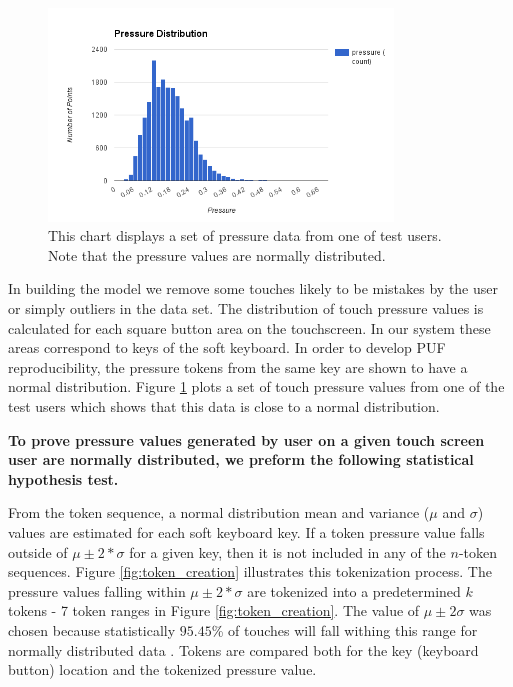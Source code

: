 \documentclass{acm_proc_article-sp}
\begin{document}
\begin{figure}
\centering
\includegraphics[width=3.6in]{normal_distribution.png}
\caption{This chart displays a set of pressure data from one of test users. Note that the pressure values are normally distributed.}
\label{fig:normal_distribution}
\end{figure}


In building the model we remove some touches likely to be mistakes by the user or simply outliers in the data set.
The distribution of touch pressure values is calculated for each square button area on the touchscreen. 
In our system these areas correspond to keys of the soft keyboard. In order to develop PUF reproducibility,
the pressure tokens from the same key are %
shown to have a normal distribution.
Figure \ref{fig:normal_distribution} plots a set of touch pressure values from one of the test users
which shows that this data is close to a normal distribution.

\textbf{
To prove pressure values generated by user on a given touch screen user are normally distributed,
we preform the following statistical hypothesis test.
}

From the token sequence, a normal distribution mean and variance ($\mu$ and $\sigma$) values are estimated for each soft keyboard key.
If a token pressure value falls outside of $\mu \pm 2*\sigma$ for a given key, 
then it is not included in any of the $n$-token sequences. 
Figure \ref{fig:token_creation} illustrates 
this tokenization process. The pressure values falling within $\mu \pm 2*\sigma$ are tokenized
into a predetermined $k$ tokens - 7 token ranges in Figure \ref{fig:token_creation}.
The value of $\mu\pm2\sigma$ was chosen because statistically $95.45$\% of touches 
will fall withing this range for normally distributed data \cite{threesigmarule}.
Tokens are compared both for the key (keyboard button) location and the tokenized pressure value.
\end{document}
